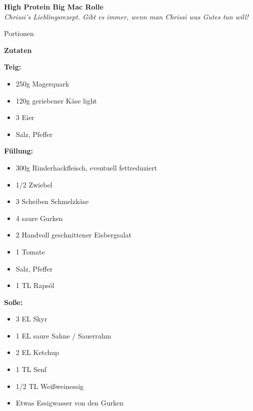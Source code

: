 \documentclass[a5paper,10pt]{article}
\begin{document}
\begin{center}
    \textbf{\huge \color{recipecolor} High Protein Big Mac Rolle}\\
    \vspace{0.5cm}
    \textit{Chrissi's Lieblingsrezept. Gibt es immer, wenn man Chrissi was Gutes tun will!}
\end{center}

 Portionen

\vspace{0.5cm}
\noindent\textbf{\large Zutaten}
\vspace{0.2cm}

\noindent\textbf{Teig:}
\begin{itemize}
    \item 250g Magerquark
    \item 120g geriebener Käse light
    \item 3 Eier
    \item Salz, Pfeffer
\end{itemize}

\noindent\textbf{Füllung:}
\begin{itemize}
    \item 300g Rinderhackfleisch, eventuell fettreduziert
    \item 1/2 Zwiebel
    \item 3 Scheiben Schmelzkäse
    \item 4 saure Gurken
    \item 2 Handvoll geschnittener Eisbergsalat
    \item 1 Tomate
    \item Salz, Pfeffer
    \item 1 TL Rapsöl
\end{itemize}

\noindent\textbf{Soße:}
\begin{itemize}
    \item 3 EL Skyr
    \item 1 EL saure Sahne / Sauerrahm
    \item 2 EL Ketchup
    \item 1 TL Senf
    \item 1/2 TL Weißweinessig
    \item Etwas Essigwasser von den Gurken
\end{itemize}
\end{document}

